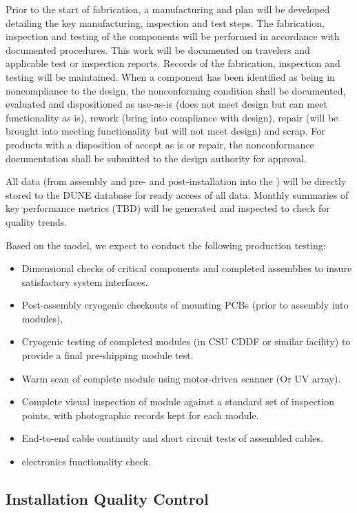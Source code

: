 Prior to the start of fabrication, a manufacturing and  plan will be developed detailing the key manufacturing, inspection and test steps.  The fabrication, inspection and testing of the components will be performed in accordance with documented procedures. This work will be documented on travelers and applicable test or inspection reports. Records of the fabrication, inspection and testing will be maintained. When a component has been identified as being in noncompliance to the design, the nonconforming condition shall be documented, evaluated and dispositioned as use-as-is (does not meet design but can meet functionality as is), rework (bring into compliance with design), repair (will be brought into meeting functionality but will not meet design) and scrap. For products with a disposition of accept as is or repair, the nonconformance documentation shall be submitted to the design authority for approval.   

All  data  (from assembly and pre- and post-installation into the ) will be directly stored to the DUNE database for ready access of all  data.  Monthly summaries of key performance metrics (TBD) will be generated and inspected to check for quality trends.

Based on the  model, we expect to conduct the following production testing:
\begin{itemize}
\item Dimensional checks of critical components and completed assemblies to insure satisfactory system interfaces.
\item Post-assembly cryogenic checkouts of  mounting PCBs (prior to assembly into  modules).
\item Cryogenic testing of completed modules (in CSU CDDF or similar facility) to provide a final pre-shipping module test.
\item Warm scan of complete module using motor-driven  scanner (Or UV   array).
\item Complete visual inspection of module against a standard set of inspection points, with photographic records kept for each module.
\item End-to-end cable continuity and short circuit tests of assembled cables.
\item {} electronics functionality check.
\end{itemize}

\subsection{Installation Quality Control}
\label{sec:fdsp-pd-prodqc}

